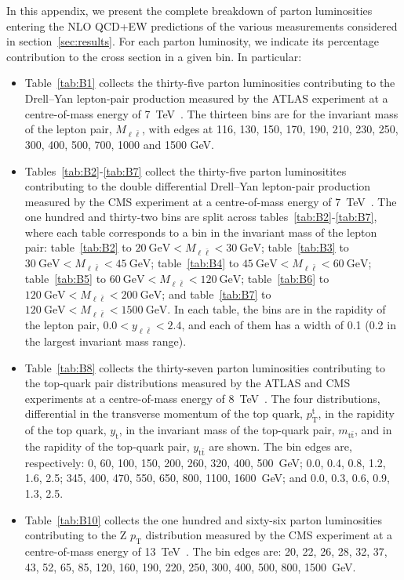 In this appendix, we present the complete breakdown of parton luminosities
entering the NLO QCD+EW predictions of the various measurements
considered in section~\ref{sec:results}. For each parton luminosity,
we indicate its percentage contribution to the cross section in a given bin.
In particular:
\begin{itemize}
\item Table~\ref{tab:B1} collects the thirty-five parton luminosities
  contributing to the Drell--Yan lepton-pair production measured by the
  ATLAS experiment at a centre-of-mass energy of
  \SI{7}{\tera\electronvolt}~\cite{Aad:2013iua}.
  The thirteen bins are for the invariant mass of the lepton pair,
  $M_{\ell\bar\ell}$, with edges at 116, 130, 150, 170, 190,
  210, 230, 250, 300, 400, 500, 700, 1000 and 1500 GeV.
\item Tables~\ref{tab:B2}-\ref{tab:B7} collect the thirty-five parton
  luminositites contributing to the double differential Drell--Yan lepton-pair
  production measured by the CMS experiment at a centre-of-mass energy of
  \SI{7}{\tera\electronvolt}~\cite{Aad:2013iua}. The one hundred and thirty-two
  bins are split across tables~\ref{tab:B2}-\ref{tab:B7}, where each table
  corresponds to a bin in the invariant mass of the lepton pair:
  table~\ref{tab:B2} to  $\SI{20}{\giga\electronvolt}<M_{\ell\bar\ell}<\SI{30}{\giga\electronvolt}$; table~\ref{tab:B3} to  $\SI{30}{\giga\electronvolt}<M_{\ell\bar\ell}<\SI{45}{\giga\electronvolt}$; table~\ref{tab:B4} to  $\SI{45}{\giga\electronvolt}<M_{\ell\bar\ell}<\SI{60}{\giga\electronvolt}$; table~\ref{tab:B5} to  $\SI{60}{\giga\electronvolt}<M_{\ell\bar\ell}<\SI{120}{\giga\electronvolt}$; table~\ref{tab:B6} to $\SI{120}{\giga\electronvolt}<M_{\ell\bar\ell}<\SI{200}{\giga\electronvolt}$; and table~\ref{tab:B7} to $\SI{120}{\giga\electronvolt}<M_{\ell\bar\ell}<\SI{1500}{\giga\electronvolt}$. In each table, the bins are in the rapidity of the lepton pair, $0.0<y_{\ell\bar\ell}<2.4$, and each of them has a width of 0.1 (0.2 in the largest invariant mass range).
\item Table~\ref{tab:B8} collects the thirty-seven parton luminosities
  contributing to the top-quark pair distributions measured by the ATLAS and
  CMS experiments at a centre-of-mass energy of
  \SI{8}{\tera\electronvolt}~\cite{Aad:2015mbv,Khachatryan:2015oqa}.
  The four distributions, differential in the transverse momentum of the top
  quark, $p_\mathrm{T}^\mathrm{t}$, in the rapidity of the top quark,
  $y_\mathrm{t}$, in the invariant mass of the top-quark pair,
  $m_{\mathrm{t}\bar{\mathrm{t}}}$, and in the rapidity of the top-quark pair,
  $y_{\mathrm{t}\bar{\mathrm{t}}}$ are shown. The bin edges are, respectively:
  0, 60, 100, 150, 200, 260, 320, 400, 500~GeV; 0.0, 0.4, 0.8, 1.2, 1.6, 2.5;
  345, 400, 470, 550, 650, 800, 1100, 1600~GeV;
  and 0.0, 0.3, 0.6, 0.9, 1.3, 2.5.
\item Table~\ref{tab:B10} collects the one hundred and sixty-six
  parton luminosities contributing to the Z $p_{\mathrm{T}}$ distribution
  measured by the CMS experiment at a centre-of-mass energy of
  \SI{13}{\tera\electronvolt}~\cite{Sirunyan:2019bzr}. The bin edges are:
  20, 22, 26, 28, 32, 37, 43, 52, 65, 85, 120, 160, 190, 220, 250, 300,
  400, 500, 800, 1500~GeV.
\end{itemize}
